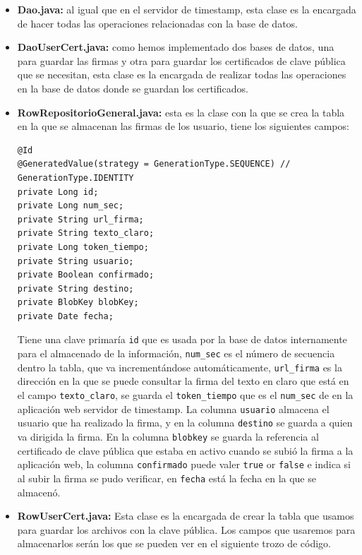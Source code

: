 \begin{itemize}

\item \textbf{Dao.java:} al igual que en el servidor de timestamp, esta clase es la encargada de hacer todas las operaciones relacionadas con la base de datos.

\item \textbf{DaoUserCert.java:} como hemos implementado dos bases de datos, una para guardar las firmas y otra para guardar los certificados de clave pública que se necesitan, esta clase es la encargada de realizar todas las operaciones en la base de datos donde se guardan los certificados. 

\item \textbf{RowRepositorioGeneral.java:} esta es la clase con la que se crea la tabla en la que se almacenan las firmas de los usuario, tiene los siguientes campos:  

\begin{lstlisting}[style=Java]
@Id
@GeneratedValue(strategy = GenerationType.SEQUENCE) //	 GenerationType.IDENTITY
private Long id;
private Long num_sec;
private String url_firma;
private String texto_claro;
private Long token_tiempo;
private String usuario;
private Boolean confirmado;
private String destino;
private BlobKey blobKey;
private Date fecha;
\end{lstlisting}

Tiene una clave primaría \lstinline{id} que es usada por la base de datos internamente para el almacenado de la información, \lstinline{num_sec} es el número de secuencia dentro la tabla, que va incrementándose automáticamente, \lstinline{url_firma} es la dirección en la que se puede consultar la firma del texto en claro que está en el campo \lstinline{texto_claro}, se guarda el \lstinline{token_tiempo} que es el \lstinline{num_sec} de en la aplicación web servidor de timestamp. La columna \lstinline{usuario} almacena el usuario que ha realizado la firma, y en la columna \lstinline{destino} se guarda a quien va dirigida la firma. En la columna \lstinline{blobkey} se guarda la referencia al certificado de clave pública que estaba en activo cuando se subió la firma a la aplicación web, la columna \lstinline{confirmado} puede valer \lstinline{true} or \lstinline{false} e indica si al subir la firma se pudo verificar, en \lstinline{fecha} está la fecha en la que se almacenó.

\item \textbf{RowUserCert.java:} Esta clase es la encargada de crear la tabla que usamos para guardar los archivos con la clave pública. Los campos que usaremos para almacenarlos serán los que se pueden ver en el siguiente trozo de código.


\end{itemize}
